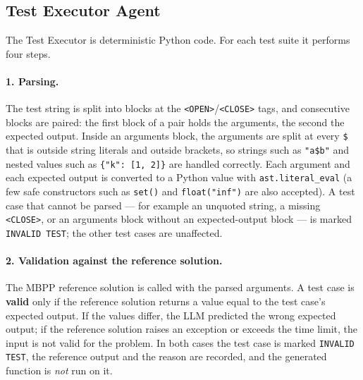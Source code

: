\documentclass[12pt, a4paper]{article}
\begin{document}
\subsection{Test Executor Agent}
\label{sec:executor}

The Test Executor is deterministic Python code. For each test suite it performs four steps.

\paragraph{1. Parsing.} The test string is split into blocks at the \texttt{<OPEN>}/\texttt{<CLOSE>} tags, and consecutive blocks are paired: the first block of a pair holds the arguments, the second the expected output. Inside an arguments block, the arguments are split at every \texttt{\$} that is outside string literals and outside brackets, so strings such as \texttt{"a\$b"} and nested values such as \texttt{\{"k": [1, 2]\}} are handled correctly. Each argument and each expected output is converted to a Python value with \texttt{ast.literal\_eval} (a few safe constructors such as \texttt{set()} and \texttt{float("inf")} are also accepted). A test case that cannot be parsed --- for example an unquoted string, a missing \texttt{<CLOSE>}, or an arguments block without an expected-output block --- is marked \texttt{INVALID TEST}; the other test cases are unaffected.

\paragraph{2. Validation against the reference solution.} The MBPP reference solution is called with the parsed arguments. A test case is \textbf{valid} only if the reference solution returns a value equal to the test case's expected output. If the values differ, the LLM predicted the wrong expected output; if the reference solution raises an exception or exceeds the time limit, the input is not valid for the problem. In both cases the test case is marked \texttt{INVALID TEST}, the reference output and the reason are recorded, and the generated function is \emph{not} run on it.
\end{document}

